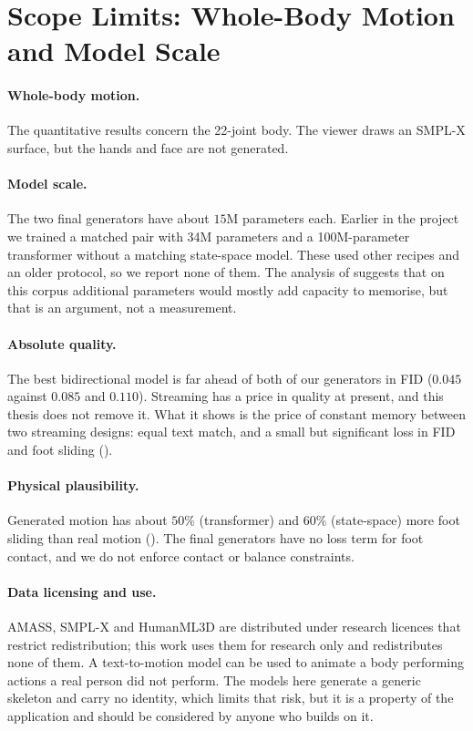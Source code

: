 \section{Scope Limits: Whole-Body Motion and Model Scale}
\label{sec:disc_scope}

\paragraph{Whole-body motion.} The quantitative results concern the 22-joint body. The viewer draws an SMPL-X surface, but the hands and face are not generated.

\paragraph{Model scale.} The two final generators have about $15$M parameters each. Earlier in the project we trained a matched pair with 34M parameters and a 100M-parameter transformer without a matching state-space model. These used other recipes and an older protocol, so we report none of them. The analysis of  suggests that on this corpus additional parameters would mostly add capacity to memorise, but that is an argument, not a measurement.

\paragraph{Absolute quality.} The best bidirectional model is far ahead of both of our generators in FID ($0.045$ against $0.085$ and $0.110$). Streaming has a price in quality at present, and this thesis does not remove it. What it shows is the price of constant memory between two streaming designs: equal text match, and a small but significant loss in FID and foot sliding ().

\paragraph{Physical plausibility.} Generated motion has about $50\%$ (transformer) and $60\%$ (state-space) more foot sliding than real motion (). The final generators have no loss term for foot contact, and we do not enforce contact or balance constraints.

\paragraph{Data licensing and use.} AMASS, SMPL-X and HumanML3D are distributed under research licences that restrict redistribution; this work uses them for research only and redistributes none of them. A text-to-motion model can be used to animate a body performing actions a real person did not perform. The models here generate a generic skeleton and carry no identity, which limits that risk, but it is a property of the application and should be considered by anyone who builds on it.
